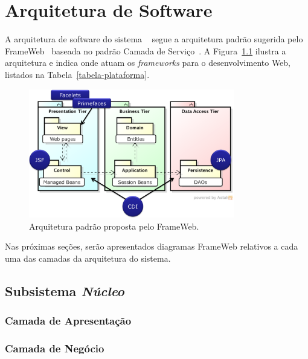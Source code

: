 
\chapter{Arquitetura de Software}
\label{sec-arquitetura}

A arquitetura de software do sistema~\imprimirtitulo \,\, segue a arquitetura padrão sugerida pelo FrameWeb~\cite{souza:masterthesis07,souza-et-al:iism09} baseada no padrão Camada de Serviço~\cite{fowler:book02}. A Figura~\ref{figura-arquitetura-padrao} ilustra a arquitetura e indica onde atuam os \textit{frameworks} para o desenvolvimento Web, listados na Tabela~\ref{tabela-plataforma}.

\begin{figure}[h]
	\centering
	\includegraphics[width=0.8\textwidth]{figuras/figura-arquitetura-padrao.png}
	\caption{Arquitetura padrão proposta pelo FrameWeb.}
	\label{figura-arquitetura-padrao}
\end{figure}

Nas próximas seções, serão apresentados diagramas FrameWeb relativos a cada uma das camadas da arquitetura do sistema.

\section{Subsistema \textit{Núcleo}}
\subsection{Camada de Apresentação}
\label{subsec-arquitetura-apresentacao-nucleo}



\subsection{Camada de Negócio}
\label{subsec-arquitetura-negocio-nucleo}

